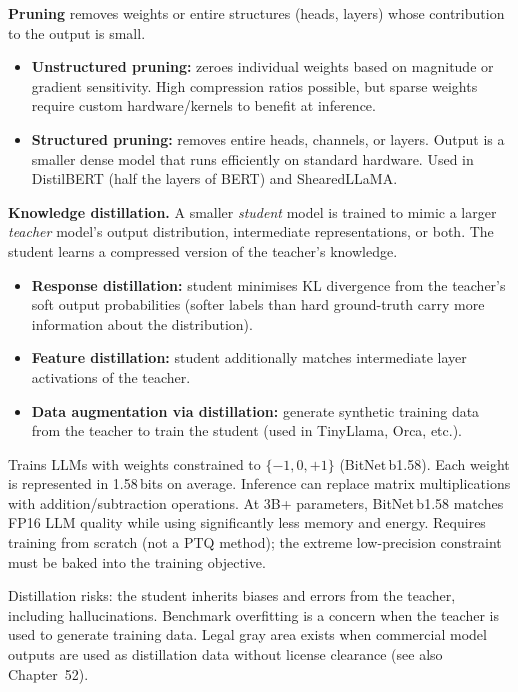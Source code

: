 \textbf{Pruning} removes weights or entire structures (heads, layers) whose contribution
to the output is small.
\begin{itemize}
  \item \textbf{Unstructured pruning:} zeroes individual weights based on magnitude or
    gradient sensitivity. High compression ratios possible, but sparse weights require
    custom hardware/kernels to benefit at inference.
  \item \textbf{Structured pruning:} removes entire heads, channels, or layers. Output
    is a smaller dense model that runs efficiently on standard hardware. Used in DistilBERT
    (half the layers of BERT) and ShearedLLaMA.
\end{itemize}

\textbf{Knowledge distillation.} A smaller \emph{student} model is trained to mimic a
larger \emph{teacher} model's output distribution, intermediate representations, or
both. The student learns a compressed version of the teacher's knowledge.
\begin{itemize}
  \item \textbf{Response distillation:} student minimises KL divergence from the
    teacher's soft output probabilities (softer labels than hard ground-truth carry
    more information about the distribution).
  \item \textbf{Feature distillation:} student additionally matches intermediate
    layer activations of the teacher.
  \item \textbf{Data augmentation via distillation:} generate synthetic training data
    from the teacher to train the student (used in TinyLlama, Orca, etc.).
\end{itemize}

\begin{paperbox}[title={BitNet / 1-bit LLMs (Ma et al.\ 2024)}]
  Trains LLMs with weights constrained to $\{-1, 0, +1\}$ (BitNet\,b1.58). Each weight
  is represented in 1.58\,bits on average. Inference can replace matrix multiplications
  with addition/subtraction operations. At 3B+ parameters, BitNet\,b1.58 matches
  FP16 LLM quality while using significantly less memory and energy.
  Requires training from scratch (not a PTQ method); the extreme low-precision
  constraint must be baked into the training objective.
\end{paperbox}

\begin{warnbox}
  Distillation risks: the student inherits biases and errors from the teacher, including
  hallucinations. Benchmark overfitting is a concern when the teacher is used to generate
  training data. Legal gray area exists when commercial model outputs are used as
  distillation data without license clearance (see also Chapter~52).
\end{warnbox}
